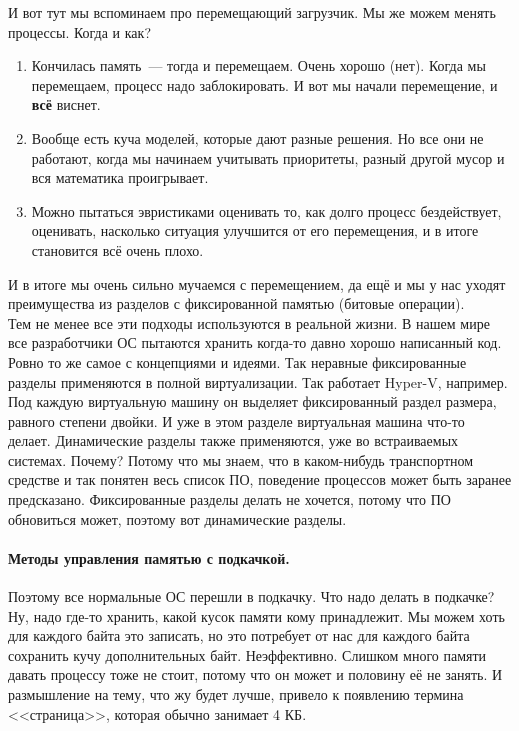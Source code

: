 \documentclass{article}
\begin{document}
    И вот тут мы вспоминаем про перемещающий загрузчик. Мы же можем менять процессы. Когда и как?
    \begin{enumerate}
        \item Кончилась память~--- тогда и перемещаем. Очень хорошо (нет). Когда мы перемещаем, процесс надо заблокировать. И вот мы начали перемещение, и \textbf{всё} виснет.
        \item Вообще есть куча моделей, которые дают разные решения. Но все они не работают, когда мы начинаем учитывать приоритеты, разный другой мусор и вся математика проигрывает.
        \item Можно пытаться эвристиками оценивать то, как долго процесс бездействует, оценивать, насколько ситуация улучшится от его перемещения, и в итоге становится всё очень плохо.
    \end{enumerate}
    И в итоге мы очень сильно мучаемся с перемещением, да ещё и мы у нас уходят преимущества из разделов с фиксированной памятью (битовые операции).\\
    Тем не менее все эти подходы используются в реальной жизни. В нашем мире все разработчики ОС пытаются хранить когда-то давно хорошо написанный код. Ровно то же самое с концепциями и идеями. Так неравные фиксированные разделы применяются в полной виртуализации. Так работает Hyper-V, например. Под каждую виртуальную машину он выделяет фиксированный раздел размера, равного степени двойки. И уже в этом разделе виртуальная машина что-то делает. Динамические разделы также применяются, уже во встраиваемых системах. Почему? Потому что мы знаем, что в каком-нибудь транспортном средстве и так понятен весь список ПО, поведение процессов может быть заранее предсказано. Фиксированные разделы делать не хочется, потому что ПО обновиться может, поэтому вот динамические разделы.\\
    \paragraph{Методы управления памятью с подкачкой.}
    Поэтому все нормальные ОС перешли в подкачку. Что надо делать в подкачке? Ну, надо где-то хранить, какой кусок памяти кому принадлежит. Мы можем хоть для каждого байта это записать, но это потребует от нас для каждого байта сохранить кучу дополнительных байт. Неэффективно. Слишком много памяти давать процессу тоже не стоит, потому что он может и половину её не занять. И размышление на тему, что жу будет лучше, привело к появлению термина <<страница>>, которая обычно занимает 4 КБ.
\end{document}
